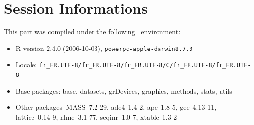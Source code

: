 \documentclass{article}
\begin{document}
\section{Session Informations}

This part was compiled under the following \Rlogo{}~environment:

\begin{itemize}
  \item R version 2.4.0 (2006-10-03), \verb|powerpc-apple-darwin8.7.0|
  \item Locale: \verb|fr_FR.UTF-8/fr_FR.UTF-8/fr_FR.UTF-8/C/fr_FR.UTF-8/fr_FR.UTF-8|
  \item Base packages: base, datasets, grDevices, graphics, methods,
    stats, utils
  \item Other packages: MASS~7.2-29, ade4~1.4-2, ape~1.8-5,
    gee~4.13-11, lattice~0.14-9, nlme~3.1-77, seqinr~1.0-7,
    xtable~1.3-2
\end{itemize}


\clearpage
{}


\end{document}
